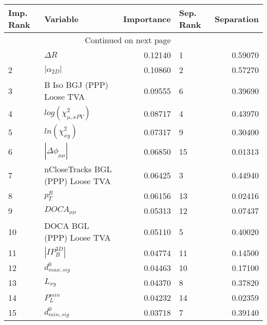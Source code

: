 \usepackage{lscape}

\begin{landscape}
\begin{longtable}{llrlr}
\toprule
Imp. Rank &                          Variable &  Importance & Sep. Rank &  Separation \\
\midrule
\endhead
\midrule
\multicolumn{3}{r}{{Continued on next page}} \\
\midrule
\endfoot

\bottomrule
\endlastfoot
        1 &                        $\Delta R$ &     0.12140 &         1 &     0.59070 \\
        2 &                   $|\alpha_{2D}|$ &     0.10860 &         2 &     0.57270 \\
        3 &         B Iso BGJ (PPP) Loose TVA &     0.09555 &         6 &     0.39690 \\
        4 &         $log(\chi^{2}_{\mu,xPV})$ &     0.08717 &         4 &     0.43970 \\
        5 &               $ln(\chi^{2}_{xy})$ &     0.07317 &         9 &     0.30400 \\
        6 &          $|\Delta \phi_{\mu\mu}|$ &     0.06850 &        15 &     0.01313 \\
        7 &  nCloseTracks BGL (PPP) Loose TVA &     0.06425 &         3 &     0.44940 \\
        8 &                         $p^B_{T}$ &     0.06156 &        13 &     0.02416 \\
        9 &                   $DOCA_{\mu\mu}$ &     0.05313 &        12 &     0.07437 \\
       10 &          DOCA BGL (PPP) Loose TVA &     0.05110 &         5 &     0.40020 \\
       11 &                   $|IP_{B}^{3D}|$ &     0.04774 &        11 &     0.14500 \\
       12 &                  $d^0_{max, sig}$ &     0.04463 &        10 &     0.17100 \\
       13 &                          $L_{xy}$ &     0.04370 &         8 &     0.37820 \\
       14 &                     $P^{min}_{L}$ &     0.04232 &        14 &     0.02359 \\
       15 &                  $d^0_{min, sig}$ &     0.03718 &         7 &     0.39140 \\
\end{longtable}

\end{landscape}

